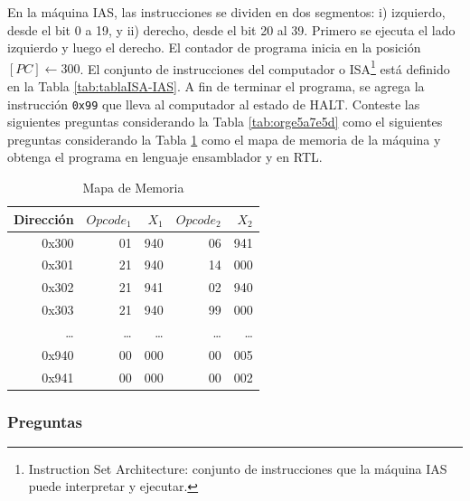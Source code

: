 \documentclass{article}
\begin{document}
En la máquina IAS, las instrucciones se dividen en dos segmentos:
i) izquierdo, desde el bit 0 a 19, y ii) derecho, desde el bit 20 al 39. Primero
se ejecuta el lado izquierdo y luego el derecho. El
contador de programa inicia en la posición \([PC] \leftarrow 300\). El conjunto de
instrucciones del computador o ISA\footnote{Instruction Set Architecture: conjunto de instrucciones que la máquina IAS puede interpretar y ejecutar.} está definido en la Tabla
\ref{tab:tablaISA-IAS}. A fin de terminar el programa, se agrega la
instrucción \texttt{0x99} que lleva al computador al estado de HALT. Conteste las
siguientes preguntas considerando la Tabla \ref{tab:orge5a7e5d} como el
siguientes preguntas considerando la Tabla \ref{tab:org1bbed3a} como el
mapa de memoria de la máquina y obtenga el programa en lenguaje ensamblador y en
RTL.

\begin{table}[htbp]
\caption{\label{tab:orge5a7e5d}Mapa de Memoria}
\caption{\label{tab:org1bbed3a}Mapa de Memoria}
\centering
\begin{tabular}{rrrrr}
\hline
Dirección & \(Opcode_1\) & \(X_1\) & \(Opcode_2\) & \(X_2\)\\[0pt]
\hline
0x300 & 01 & 940 & 06 & 941\\[0pt]
0x301 & 21 & 940 & 14 & 000\\[0pt]
0x302 & 21 & 941 & 02 & 940\\[0pt]
0x303 & 21 & 940 & 99 & 000\\[0pt]
\ldots{} & \ldots{} & \ldots{} & \ldots{} & \ldots{}\\[0pt]
0x940 & 00 & 000 & 00 & 005\\[0pt]
0x941 & 00 & 000 & 00 & 002\\[0pt]
\hline
\end{tabular}
\end{table}

\subsubsection{Preguntas}
\label{sec:orgdc5cfbe}
\label{sec:orge138103}
\end{document}
